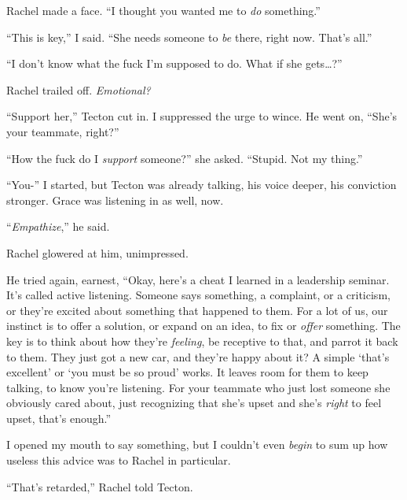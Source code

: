Rachel made a face.  ``I thought you wanted me to \emph{do} something.''



``This is key,'' I said.  ``She needs someone to \emph{be} there, right now.  That's all.''



``I don't know what the fuck I'm supposed to do.  What if she gets\ldots?''



Rachel trailed off.  \emph{Emotional?}



``Support her,'' Tecton cut in.  I suppressed the urge to wince.  He went on, ``She's your teammate, right?''



``How the fuck do I \emph{support }someone?'' she asked.  ``Stupid.  Not my thing.''



``You-'' I started, but Tecton was already talking, his voice deeper, his conviction stronger.  Grace was listening in as well, now.



``\emph{Empathize},'' he said.



Rachel glowered at him, unimpressed.



He tried again, earnest, ``Okay, here's a cheat I learned in a leadership seminar.  It's called active listening.  Someone says something, a complaint, or a criticism, or they're excited about something that happened to them.  For a lot of us, our instinct is to offer a solution, or expand on an idea, to fix or \emph{offer} something.  The key is to think about how they're \emph{feeling}, be receptive to that, and parrot it back to them.  They just got a new car, and they're happy about it?  A simple `that's excellent' or `you must be so proud' works.  It leaves room for them to keep talking, to know you're listening.  For your teammate who just lost someone she obviously cared about, just recognizing that she's upset and she's \emph{right} to feel upset, that's enough.''



I opened my mouth to say something, but I couldn't even \emph{begin }to sum up how useless this advice was to Rachel in particular.



``That's retarded,'' Rachel told Tecton.



